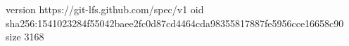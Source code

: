 version https://git-lfs.github.com/spec/v1
oid sha256:1541023284f55042baee2fc0d87cd4464cda98355817887fe5956cce16658c90
size 3168
